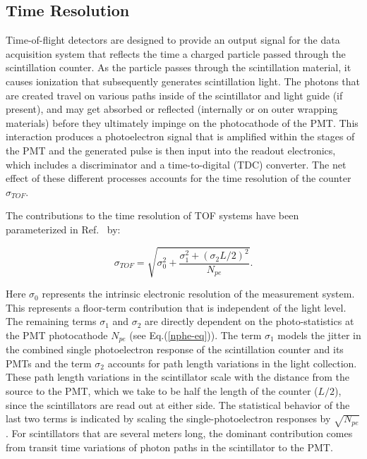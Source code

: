 \documentclass{elsart}
\begin{document}
\subsection{Time Resolution}
\label{res-sec}

Time-of-flight detectors are designed to provide an output signal for the data acquisition system that
reflects the time a charged particle passed through the scintillation counter. As the particle passes
through the scintillation material, it causes ionization that subsequently generates scintillation light. The
photons that are created travel on various paths inside of the scintillator and light guide (if present), and
may get absorbed or reflected (internally or on outer wrapping materials) before they ultimately impinge
on the photocathode of the PMT. This interaction produces a photoelectron signal that is amplified within
the stages of the PMT and the generated pulse is then input into the readout electronics, which includes a
discriminator and a time-to-digital (TDC) converter. The net effect of these different processes accounts
for the time resolution of the counter $\sigma_{TOF}$.

The contributions to the time resolution of TOF systems have been parameterized in Ref.~\cite{kuhlen}
by:

\begin{equation}
\label{timing-func}
\sigma_{TOF} = \sqrt{\sigma_0^2 + \frac{\sigma_1^2 + (\sigma_2 L/2)^2} {N_{pe}}}.
\end{equation}

Here $\sigma_0$ represents the intrinsic electronic resolution of the measurement system. This
represents a floor-term contribution that is independent of the light level. The remaining terms
$\sigma_1$ and $\sigma_2$ are directly dependent on the photo-statistics at the PMT photocathode
$N_{pe}$ (see Eq.(\ref{nphe-eq})). The term $\sigma_1$ models the jitter in the combined single
photoelectron response of the scintillation counter and its PMTs and the term $\sigma_2$ accounts
for path length variations in the light collection.  These path length variations in the scintillator scale
with the distance from the source to the PMT, which we take to be half the length of the counter
($L/2$), since the scintillators are read out at either side.  The statistical behavior of the last two
terms is indicated by scaling the single-photoelectron responses by $\sqrt{N_{pe}}$. For scintillators
that are several meters long, the dominant contribution comes from transit time variations of photon
paths in the scintillator to the PMT.
\end{document}
